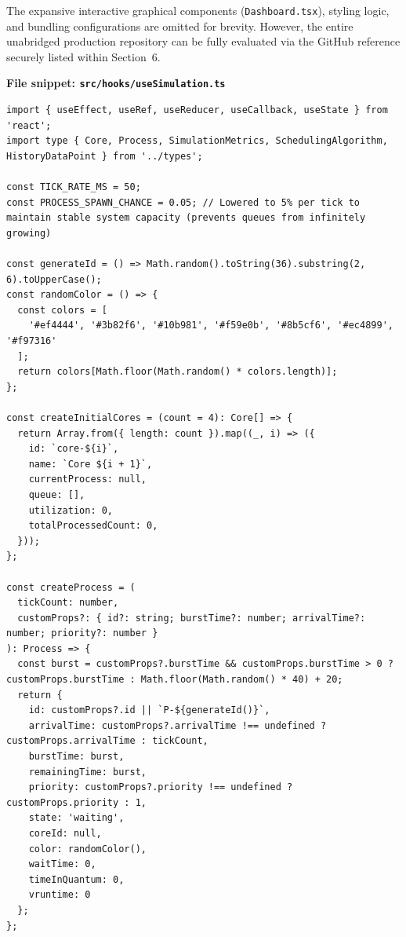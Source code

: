 \documentclass[a4paper]{article}
\begin{document}
The expansive interactive graphical components (\texttt{Dashboard.tsx}), styling logic, and bundling configurations are omitted for brevity. However, the entire unabridged production repository can be fully evaluated via the GitHub reference securely listed within Section~6.

\vspace{1em}
\noindent\textbf{File snippet: \texttt{src/hooks/useSimulation.ts}}

\begin{lstlisting}
import { useEffect, useRef, useReducer, useCallback, useState } from 'react';
import type { Core, Process, SimulationMetrics, SchedulingAlgorithm, HistoryDataPoint } from '../types';

const TICK_RATE_MS = 50; 
const PROCESS_SPAWN_CHANCE = 0.05; // Lowered to 5% per tick to maintain stable system capacity (prevents queues from infinitely growing)

const generateId = () => Math.random().toString(36).substring(2, 6).toUpperCase();
const randomColor = () => {
  const colors = [
    '#ef4444', '#3b82f6', '#10b981', '#f59e0b', '#8b5cf6', '#ec4899', '#f97316'
  ];
  return colors[Math.floor(Math.random() * colors.length)];
};

const createInitialCores = (count = 4): Core[] => {
  return Array.from({ length: count }).map((_, i) => ({
    id: `core-${i}`,
    name: `Core ${i + 1}`,
    currentProcess: null,
    queue: [],
    utilization: 0,
    totalProcessedCount: 0,
  }));
};

const createProcess = (
  tickCount: number, 
  customProps?: { id?: string; burstTime?: number; arrivalTime?: number; priority?: number }
): Process => {
  const burst = customProps?.burstTime && customProps.burstTime > 0 ? customProps.burstTime : Math.floor(Math.random() * 40) + 20;
  return {
    id: customProps?.id || `P-${generateId()}`,
    arrivalTime: customProps?.arrivalTime !== undefined ? customProps.arrivalTime : tickCount,
    burstTime: burst,
    remainingTime: burst,
    priority: customProps?.priority !== undefined ? customProps.priority : 1,
    state: 'waiting',
    coreId: null,
    color: randomColor(),
    waitTime: 0,
    timeInQuantum: 0,
    vruntime: 0
  };
};


\end{lstlisting}
\end{document}
